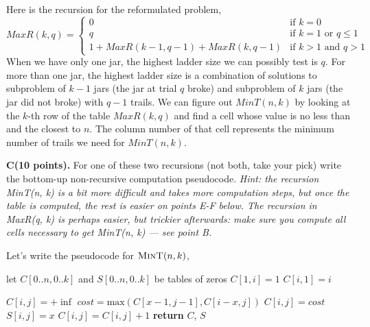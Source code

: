 \documentclass[11pt]{article}
\theoremstyle{definition}
\theoremstyle{theorem}
\newcommand{\solution}{\medskip\noindent{\color{DarkBlue}\textbf{Solution:}}}
\begin{document}
Here is the recursion for the reformulated problem,
\[
\textit{MaxR}(k, q) =
\begin{cases}
	0 &\mbox{if } k = 0 \\
	q &\mbox{if } k = 1 \text{ or } q \le 1 \\
	1 + \textit{MaxR}(k - 1, q - 1) + \textit{MaxR}(k, q - 1) &\mbox{if } k > 1 \text{ and } q > 1
\end{cases}
\]
When we have only one jar, the highest ladder size we can possibly test is $q$. For more than one jar, the highest ladder size is a combination of solutions to subproblem of $k-1$ jars (the jar at trial $q$ broke) and subproblem of $k$ jars (the jar did not broke) with $q-1$ trails. We can figure out $\textit{MinT}(n, k)$ by looking at the $k$-th row of the table $\textit{MaxR}(k, q)$ and find a cell whose value is no less than and the closest to $n$. The column number of that cell represents the minimum number of trails we need for $\textit{MinT}(n, k)$.

\newpage
\noindent\textbf{C(10 points).} For one of these two recursions (not both, take your pick) write the bottom-up non-recursive computation pseudocode. \textit{Hint:  the recursion MinT(n, k) is a bit more difficult and takes more computation steps, but once the table is computed, the rest is easier on points E-F below.  The recursion in MaxR(q, k) is perhaps easier, but trickier afterwards:  make sure you compute all cells necessary to get MinT(n, k) — see point B.}

\solution

Let's write the pseudocode for $\textproc{\textsc{MinT}}(n, k)$,

\begin{algorithmic}[1]
	\State let $C[0..n, 0..k]$ and $S[0..n, 0..k]$ be tables of zeros 
		\State $C[1, i] = 1$
	\EndFor
		\State $C[i, 1] = i$
	\EndFor
	
	 	
			\State $C[i, j] = +\inf$
				\State $\textit{cost} = \text{max}(C[x - 1, j - 1], C[i - x, j])$
					\State $C[i, j] = \textit{cost}$
					\State $S[i, j] = x$
				\EndIf
			\EndFor
			\State $C[i, j] = C[i, j] + 1$
		\EndFor
	\EndFor
	\State \textbf{return} $C$, $S$
\EndFunction
\end{algorithmic}
\end{document}
